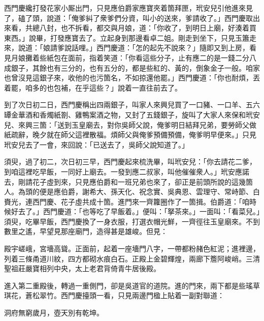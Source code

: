西門慶纔打發花家小厮出門，只見應伯爵家應寶夾着箇拜匣，玳安兒引他進來見了，磕了頭，說道：「俺爹糾了衆爹們分資，叫小的送來，爹請收了。」西門慶取出來看，共總八封，也不拆看，都交與月娘，道：「你收了，到明日上廟，好湊着買東西。」說畢，打發應寶去了。立起身到那邊看卓二姐。剛走到坐下，只見玉簫走來，說道：「娘請爹說話哩。」{}西門慶道：「怎的起先不說來？」隨即又到上房，看見月娘攤着些紙包在面前，指着笑道：「你看這些分子，止有應二的是一錢二分八成銀子，其餘也有三分的，也有五分的，都是些紅的、黃的，倒象金子一般。咱家也曾沒見這銀子來，收他的也污箇名，不如掠還他罷。」西門慶道：「你也耐煩，丟着罷，咱多的也包補，在乎這些？」說着一直往前去了。

到了次日初二日，西門慶稱出四兩銀子，叫家人來興兒買了一口豬、一口羊、五六罈金華酒和香燭紙劄、雞鴨案酒之物，又封了五錢銀子，旋叫了大家人來保和玳安兒、來興三箇：「送到玉皇廟去，對你吳師父說，俺爹明日結拜兄弟，要勞師父做紙疏辭，晚夕就在師父這裡散福。煩師父與俺爹預備預備，俺爹明早便來。」只見玳安兒去了一會，來回說：「已送去了，吳師父說知道了。」

須臾，過了初二，次日初三早，西門慶起來梳洗畢，叫玳安兒：「你去請花二爹，到咱這裡吃早飯，一同好上廟去。一發到應二叔家，叫他催催衆人。」玳安應諾去，剛請花子虛到來，只見應伯爵和一班兄弟也來了，卻正是前頭所說的這幾箇人。為頭的便是應伯爵，謝希大、孫天化、祝念實、吳典恩、雲理守、常峙節、白賚光，連西門慶、花子虛共成十箇。進門來一齊籮圈作了一箇揖。伯爵道：「咱時候好去了。」西門慶道：「也等吃了早飯着。」便叫：「拏茶來。」一面叫：「看菜兒。」須臾，吃畢早飯，西門慶換了一身衣服，打選衣帽光鮮，一齊徑往玉皇廟來。不到數里之遙，早望見那座廟門，造得甚是雄峻。但見：

\begin{myquote}
殿宇嵯峨，宮墻高聳。正面前，起着一座墻門八字，一帶都粉赭色紅泥；進裡邊，列着三條甬道川紋，四方都砌水痕白石。正殿上金碧輝煌，兩廊下簷阿峻峭。三清聖祖莊嚴寶相列中央，太上老君背倚青牛居後殿。
\end{myquote}

進入第二重殿後，轉過一重側門，卻是吳道官的道院。進的門來，兩下都是些瑤草琪花，蒼松翠竹。西門慶擡頭一看，只見兩邊門楹上貼着一副對聯道：

\begin{myquote}
洞府無窮歲月，壺天別有乾坤。
\end{myquote}

